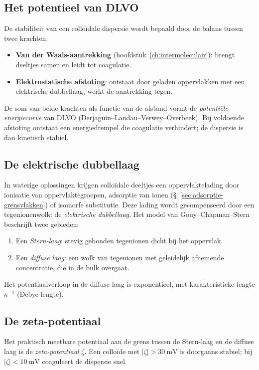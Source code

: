 \subsection{Het potentieel van DLVO}
\label{sec:dlvo}

De stabiliteit van een collo\"idale dispersie wordt bepaald door de balans tussen twee krachten:
\begin{itemize}
\item \textbf{Van der Waals-aantrekking} (hoofdstuk~\ref{ch:intermoleculair}): brengt deeltjes samen en leidt tot coagulatie.
\item \textbf{Elektrostatische afstoting}: ontstaat door geladen oppervlakken met een elektrische dubbellaag; werkt de aantrekking tegen.
\end{itemize}
De som van beide krachten als functie van de afstand vormt de \emph{potenti\"ele energiecurve} van DLVO (Derjaguin--Landau--Verwey--Overbeek). Bij voldoende afstoting ontstaat een energiedrempel die coagulatie verhindert; de dispersie is dan kinetisch stabiel.

\subsection{De elektrische dubbellaag}

In waterige oplossingen krijgen collo\"idale deeltjes een oppervlaktelading door ionisatie van oppervlaktegroepen, adsorptie van ionen (\S~\ref{sec:adsorptie-grensvlakken}) of isomorfe substitutie. Deze lading wordt gecompenseerd door een tegenionenwolk: de \emph{elektrische dubbellaag}. Het model van Gouy--Chapman--Stern beschrijft twee gebieden:
\begin{enumerate}
\item Een \emph{Stern-laag}: stevig gebonden tegenionen dicht bij het oppervlak.
\item Een \emph{diffuse laag}: een wolk van tegenionen met geleidelijk afnemende concentratie, die in de bulk overgaat.
\end{enumerate}
Het potentiaalverloop in de diffuse laag is exponentieel, met karakteristieke lengte $\kappa^{-1}$ (Debye-lengte).

\subsection{De zeta-potentiaal}

Het praktisch meetbare potentiaal aan de grens tussen de Stern-laag en de diffuse laag is de \emph{zeta-potentiaal} $\zeta$. Een collo\"ide met $|\zeta| > \SI{30}{\milli\volt}$ is doorgaans stabiel; bij $|\zeta| < \SI{10}{\milli\volt}$ coaguleert de dispersie snel.

